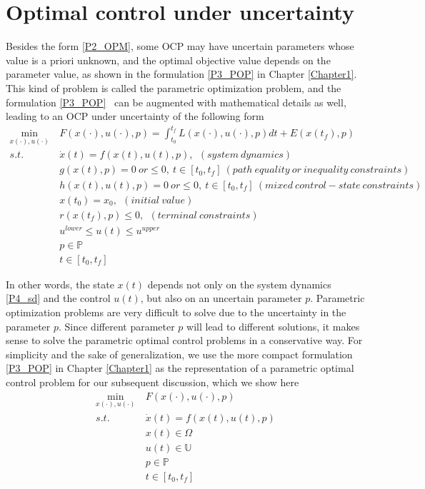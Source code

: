 \documentclass  [
  paper    = a4,
  BCOR     = 10mm,
  twoside,
  fontsize = 12pt,
  fleqn,
  toc      = bibnumbered,
  toc      = listofnumbered,
  numbers  = noendperiod,
  headings = normal,
  listof   = leveldown,
  version  = 3.03
]                                       {scrreprt}
\newcommand{\<}{\langle}
\renewcommand{\>}{\rangle}
\begin{document}
\chapter{Optimal control under uncertainty}
\label{Chapter3}
Besides the form \ref{P2_OPM}, some OCP may have uncertain parameters whose value is a priori unknown, and the optimal objective value depends on the parameter value, as shown in the formulation \ref{P3_POP} in Chapter \ref{Chapter1}. This kind of problem is called the parametric optimization problem, and the formulation \ref{P3_POP}  can be augmented with mathematical details as well, leading to an OCP under uncertainty of the following form
	\begin{subequations}
	\begin{align}
		\underset{x(\cdot), u(\cdot)}{\text{min}}   \ &  F(x(\cdot), u(\cdot), p)  = \int_{t_0}^{t_f}L(x(\cdot), u(\cdot), p)dt + E (x(t_f),p) \label{P4_cost} \\
		s.t.\ \ &  \dot{x} (t) = f(x(t), u(t), p), \ \ (system \ dynamics)   \label{P4_sd} \\
		& g(x(t), p) = 0 \  or \leq 0, \ t \in [t_0, t_f]\  (path\  equality\ or\ inequality\ constraints)   \label{P4_ec}\\
		&  h(x(t), u(t), p) =0\  or  \leq 0,\ t \in [t_0, t_f] \ (mixed \ control-state  \ constraints)   \label{P4_inc}\\
		& x(t_0) = x_0, \ \ (initial \ value) \\
		& r(x(t_f), p) \leq 0, \ \ (terminal \ constraints)  \label{P4_final} \\
		& u^{lower} \leq u(t) \leq u^{upper}   \label{P4_box_u} \\ 
		& p  \in   \mathbb{P}  \\
		& t \in [t_0, t_f] 
	\end{align}
	\label{P4_OCPPara}
\end{subequations}


In other words, the state $x(t)$ depends not only on the system dynamics \ref{P4_sd} and the control $u(t)$, but also on an uncertain parameter $p$. Parametric optimization problems are very difficult to solve due to the uncertainty in the parameter $p$. Since different parameter $p$ will lead to different solutions, it makes sense to solve the parametric optimal control problems in a conservative way. For simplicity and the sake of generalization, we use the more compact formulation \ref{P3_POP} in Chapter \ref{Chapter1} as the representation of a parametric optimal control problem for our subsequent discussion, which we show here
      \begin{equation}
	\begin{aligned}
	\underset{x(\cdot), u(\cdot)}{\text{min}}  \ &  F(x(\cdot), u(\cdot), p) \\
	s.t.\ \  &  \dot{x} (t) = f(x(t), u(t), p)\\ 
	& x(t) \in \Omega \\
	& u(t) \in \mathbb{U}  \\
	& p  \in   \mathbb{P}  \\
	& t \in [t_0, t_f]
\end{aligned}
	\label{P5_POP}
\end{equation}
\end{document}
